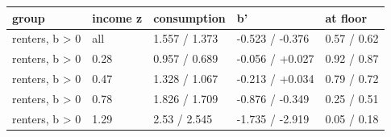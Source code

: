 \begingroup\small
\setlength{\tabcolsep}{3pt}
\renewcommand{\arraystretch}{1.04}
\begin{tabularx}{\linewidth}{XXXXX}
\toprule
group & income z & consumption & b' & at floor \\
\midrule
renters, b \textgreater{} 0 & all & 1.557 / 1.373 & -0.523 / -0.376 & 0.57 / 0.62 \\
renters, b \textgreater{} 0 & 0.28 & 0.957 / 0.689 & -0.056 / +0.027 & 0.92 / 0.87 \\
renters, b \textgreater{} 0 & 0.47 & 1.328 / 1.067 & -0.213 / +0.034 & 0.79 / 0.72 \\
renters, b \textgreater{} 0 & 0.78 & 1.826 / 1.709 & -0.876 / -0.349 & 0.25 / 0.51 \\
renters, b \textgreater{} 0 & 1.29 & 2.53 / 2.545 & -1.735 / -2.919 & 0.05 / 0.18 \\
\bottomrule
\end{tabularx}
\endgroup

